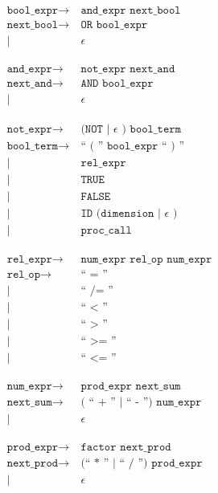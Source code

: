 \begin{align*}
	\texttt{bool\_expr}
	\rightarrow&\ \texttt{and\_expr next\_bool}\\
	\texttt{next\_bool}
	\rightarrow&\ \texttt{OR bool\_expr}\\
            |&\ \epsilon\\
	\phantom{0}\\
	\texttt{and\_expr}
	\rightarrow&\ \texttt{not\_expr next\_and}\\
	\texttt{next\_and}
	\rightarrow&\ \texttt{AND bool\_expr}\\
            |&\ \epsilon\\
	\phantom{0}\\
	\texttt{not\_expr}
	\rightarrow&\ \texttt{(NOT | } \epsilon \texttt{ ) bool\_term}\\
	\texttt{bool\_term}
	\rightarrow&\ \texttt{`` ( '' bool\_expr `` ) ''}\\
            |&\ \texttt{rel\_expr}\\
            |&\ \texttt{TRUE}\\
            |&\ \texttt{FALSE}\\
            |&\ \texttt{ID (dimension | } \epsilon \texttt{ )}\\
            |&\ \texttt{proc\_call}\\
	\phantom{0}\\
	\texttt{rel\_expr}
	\rightarrow&\ \texttt{num\_expr rel\_op num\_expr}\\
	\texttt{rel\_op}
	\rightarrow&\ \texttt{`` = ''}\\
            |&\ \texttt{`` /= ''}\\
            |&\ \texttt{`` < ''}\\
            |&\ \texttt{`` > ''}\\
            |&\ \texttt{`` >= ''}\\
            |&\ \texttt{`` <= ''}\\
	\phantom{0}\\
	\texttt{num\_expr}
	\rightarrow&\ \texttt{prod\_expr next\_sum}\\
	\texttt{next\_sum}
	\rightarrow&\ \texttt{( `` + '' | `` - '') num\_expr}\\
            |&\ \epsilon\\
	\phantom{0}\\
	\texttt{prod\_expr}
	\rightarrow&\ \texttt{factor next\_prod}\\
	\texttt{next\_prod}
	\rightarrow&\ \texttt{(`` * '' | `` / '') prod\_expr}\\
            |&\ \epsilon\\
\end{align*}

